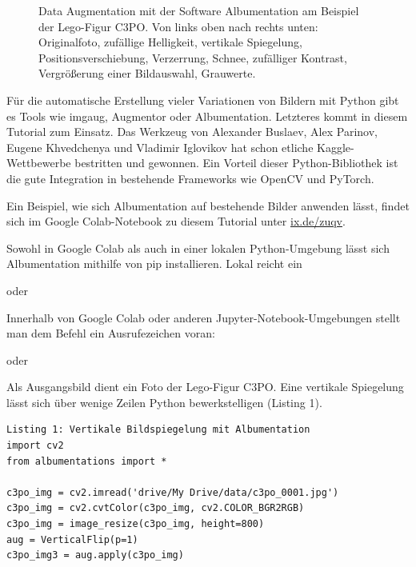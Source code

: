 \begin{figure}
	
	
	\caption{Data Augmentation mit der Software Albumentation am Beispiel der Lego-Figur C3PO. Von links oben nach rechts unten: Originalfoto, zufällige Helligkeit, vertikale Spiegelung, Positionsverschiebung, Verzerrung, Schnee, zufälliger Kontrast, Vergrößerung einer Bildauswahl, Grauwerte.}
\end{figure} 


Für die automatische Erstellung vieler Variationen von Bildern mit Python gibt es Tools wie imgaug, Augmentor oder Albumentation. Letzteres kommt in diesem Tutorial zum Einsatz. Das Werkzeug von Alexander Buslaev, Alex Parinov, Eugene Khvedchenya und Vladimir Iglovikov hat schon etliche Kaggle-Wettbewerbe bestritten und gewonnen. Ein Vorteil dieser Python-Bibliothek ist die gute Integration in bestehende Frameworks wie OpenCV und PyTorch. 

Ein Beispiel, wie sich Albumentation auf bestehende Bilder anwenden lässt, findet sich im Google Colab-Notebook zu diesem Tutorial unter \href{https://www.heise.de/select/ix/2020/6/softlinks/zuqv?wt_mc=pred.red.ix.ix062020.040.softlink.softlink}{ix.de/zuqv}.

Sowohl in Google Colab als auch in einer lokalen Python-Umgebung lässt sich Albumentation mithilfe von pip installieren. Lokal reicht ein 


oder  


Innerhalb von Google Colab oder anderen Jupyter-Notebook-Umgebungen stellt man dem Befehl ein Ausrufezeichen voran: 


oder 


Als Ausgangsbild dient ein Foto der Lego-Figur C3PO. Eine vertikale Spiegelung lässt sich über wenige Zeilen Python bewerkstelligen (Listing 1). 


\begin{lstlisting}
Listing 1: Vertikale Bildspiegelung mit Albumentation 
import cv2
from albumentations import *

c3po_img = cv2.imread('drive/My Drive/data/c3po_0001.jpg')
c3po_img = cv2.cvtColor(c3po_img, cv2.COLOR_BGR2RGB)
c3po_img = image_resize(c3po_img, height=800)
aug = VerticalFlip(p=1)
c3po_img3 = aug.apply(c3po_img)
\end{lstlisting}


